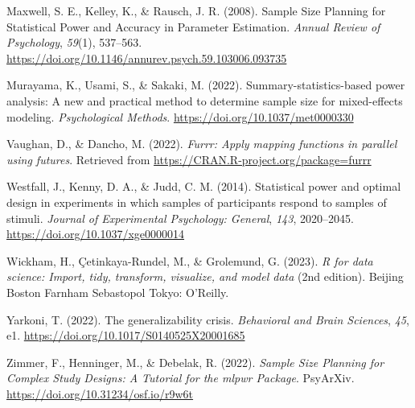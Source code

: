 \documentclass[
  man,floatsintext]{apa6}
\newlength{\cslhangindent}
\newlength{\cslentryspacingunit} %
\newenvironment{CSLReferences}[2] %
 {%
  \setlength{\parindent}{0pt}
  \ifodd #1
  \let\oldpar\par
  \def\par{\hangindent=\cslhangindent\oldpar}
  \fi
  \setlength{\parskip}{#2\cslentryspacingunit}
 }%
 {}
\begin{document}
\begin{CSLReferences}{1}{0}
\leavevmode{}%
Maxwell, S. E., Kelley, K., \& Rausch, J. R. (2008). Sample {Size Planning} for {Statistical Power} and {Accuracy} in {Parameter Estimation}. \emph{Annual Review of Psychology}, \emph{59}(1), 537--563. \url{https://doi.org/10.1146/annurev.psych.59.103006.093735}

\leavevmode{}%
Murayama, K., Usami, S., \& Sakaki, M. (2022). Summary-statistics-based power analysis: {A} new and practical method to determine sample size for mixed-effects modeling. \emph{Psychological Methods}. \url{https://doi.org/10.1037/met0000330}

\leavevmode{}%
Vaughan, D., \& Dancho, M. (2022). \emph{Furrr: Apply mapping functions in parallel using futures}. Retrieved from \url{https://CRAN.R-project.org/package=furrr}

\leavevmode{}%
Westfall, J., Kenny, D. A., \& Judd, C. M. (2014). Statistical power and optimal design in experiments in which samples of participants respond to samples of stimuli. \emph{Journal of Experimental Psychology: General}, \emph{143}, 2020--2045. \url{https://doi.org/10.1037/xge0000014}

\leavevmode{}%
Wickham, H., Çetinkaya-Rundel, M., \& Grolemund, G. (2023). \emph{R for data science: Import, tidy, transform, visualize, and model data} (2nd edition). Beijing Boston Farnham Sebastopol Tokyo: O'Reilly.

\leavevmode{}%
Yarkoni, T. (2022). The generalizability crisis. \emph{Behavioral and Brain Sciences}, \emph{45}, e1. \url{https://doi.org/10.1017/S0140525X20001685}

\leavevmode{}%
Zimmer, F., Henninger, M., \& Debelak, R. (2022). \emph{Sample {Size Planning} for {Complex Study Designs}: {A Tutorial} for the mlpwr {Package}}. PsyArXiv. \url{https://doi.org/10.31234/osf.io/r9w6t}

\end{CSLReferences}
\end{document}
